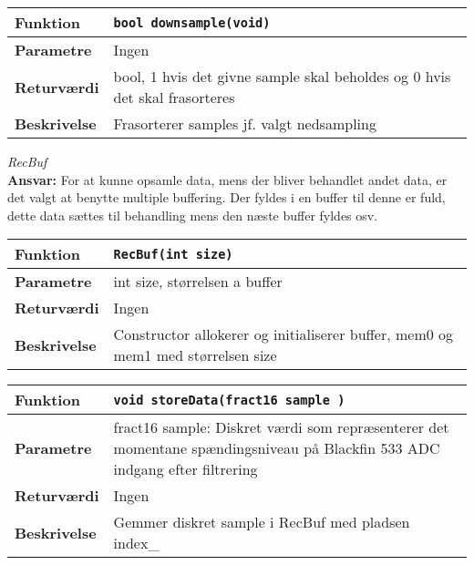 \begin{center}
    \begin{tabular}{ | l | p{} |}
    \hline
    \textbf{Funktion}	& \verb+bool downsample(void) +						\\ \hline
    \textbf{Parametre} 	& Ingen		\\ \hline
    \textbf{Returværdi}	&  bool, 1 hvis det givne sample skal beholdes og 0 hvis det skal frasorteres 								\\ \hline
    \textbf{Beskrivelse}& Frasorterer samples jf. valgt nedsampling		\\ \hline
    \end{tabular}
\end{center}


\textit{RecBuf} \\
\textbf{Ansvar:} For at kunne opsamle data, mens der bliver behandlet andet data, er det valgt at benytte multiple buffering. Der fyldes i en buffer til denne er fuld, dette data sættes til behandling mens den næste buffer fyldes osv.

\begin{center}
    \begin{tabular}{ | l | p{} |}
    \hline
    \textbf{Funktion}	& \verb+RecBuf(int size) +						\\ \hline
    \textbf{Parametre} 	& int size, størrelsen a buffer		\\ \hline
    \textbf{Returværdi}	& Ingen 								\\ \hline
    \textbf{Beskrivelse}& Constructor allokerer og initialiserer buffer, mem0 og mem1 med størrelsen size		\\ \hline
    \end{tabular}
\end{center} 

\begin{center}
    \begin{tabular}{ | l | p{} |}
    \hline
    \textbf{Funktion}	& \verb+void storeData(fract16 sample ) +						\\ \hline
    \textbf{Parametre} 	& fract16 sample: Diskret værdi som repræsenterer det momentane spændingsniveau på Blackfin 533 ADC indgang efter filtrering	\\ \hline
    \textbf{Returværdi}	& Ingen 								\\ \hline
    \textbf{Beskrivelse}& Gemmer diskret sample i RecBuf med pladsen index\_		\\ \hline
    \end{tabular}
\end{center} 



